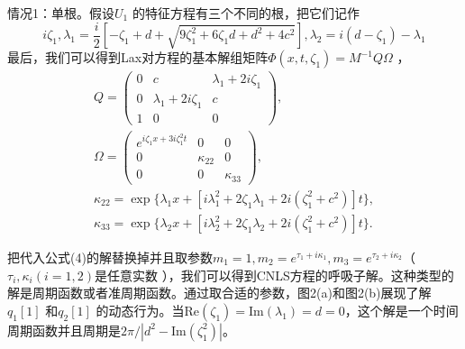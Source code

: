 \documentclass[11pt,a4paper]{ctexart}
\begin{document}
情况1：单根。假设$ U_{1}  $ 的特征方程有三个不同的根，把它们记作$$ i\zeta_{1} ,\lambda_{1} =\frac{i}{2}[-\zeta_{1} +d+\sqrt{9\zeta_{1} ^{2} +6\zeta_{1} d+d^{2} +4c^{2} }],\lambda_{2} =i(d-\zeta_{1} )-\lambda_{1}  $$最后，我们可以得到Lax对方程的基本解组矩阵$ \Phi(x,t,\zeta_{1} )=M^{-1} Q\Omega $ ，
\begin{gather*}
	Q=\begin{pmatrix}
		0 & c                        & \lambda_{1} +2i\zeta_{1} \\
		0 & \lambda_{1} +2i\zeta_{1} & c                        \\
		1 & 0                        & 0
	\end{pmatrix},\\
	\Omega=\begin{pmatrix}
		e^{i\zeta_{1} x+3i\zeta_{1} ^{2} t} & 0           & 0           \\
		0                                   & \kappa_{22} & 0           \\
		0                                   & 0           & \kappa_{33}
	\end{pmatrix},\\
	\kappa_{22} =\exp\{\lambda_{1} x+[i\lambda_{1} ^{2} +2\zeta_{1} \lambda_{1} +2i(\zeta_{1} ^{2} +c^{2} )]t\},\\
	\kappa_{33} =\exp\{\lambda_{2} x+[i\lambda_{2} ^{2} +2\zeta_{1} \lambda_{2} +2i(\zeta_{1} ^{2} +c^{2} ) ]t\}.
\end{gather*}

把代入公式(4)的解替换掉并且取参数$ m_{1} =1,m_{2} =e^{\tau_{1} +i\kappa_{1} } ,m_{3} =e^{\tau_{2} +i\kappa_{2} } $（$ \tau_{i} ,\kappa_{i} (i=1,2) $是任意实数 ），我们可以得到CNLS方程的呼吸子解。这种类型的解是周期函数或者准周期函数。通过取合适的参数，图2(a)和图2(b)展现了解$ q_{1} [1] $ 和$ q_{2} [1] $ 的动态行为。当$ \text{Re}(\zeta_{1} )=\text{Im}(\lambda_{1} )=d=0 $，这个解是一个时间周期函数并且周期是$ 2\pi/|d^{2} -\text{Im}(\zeta_{1} ^{2} )| $。
\end{document}
